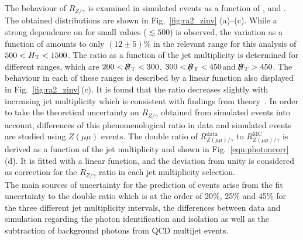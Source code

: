 The behaviour of $R_{Z/\gamma}$ is examined in simulated events as a function of \MHT, \HT and \NJets. The obtained distributions are shown in Fig.~\ref{fig:ra2_zinv} (a)--(c). While a strong dependence on \MHT for small values ($\lesssim 500$\gev) is observed, the variation as a function of \HT amounts to only $(12 \pm 5)\%$ in the relevant range for this analysis of $500 < H_{\text{T}} < 1500$\gev. The ratio as a function of the jet multiplicity is determined for different \MHT ranges, which are $200 < \slash\mkern-12mu{H}_{\text{T}} < 300$\gev, $300 < \slash\mkern-12mu{H}_{\text{T}} < 450$\gev and $\slash\mkern-12mu{H}_{\text{T}} > 450$\gev. The behaviour in each of these \MHT ranges is described by a linear function also displayed in Fig.~\ref{fig:ra2_zinv}\,(c). It is found that the ratio decreases slightly with increasing jet multiplicity which is consistent with findings from theory~\cite{Bern:2012vx, Bern:2011pa}. In order to take the theoretical uncertainty on $R_{Z/\gamma}$ obtained from simulated events into account, differences of this phenomenological ratio in data and simulated events are studied using $Z(\mu\mu)$ events. The double ratio of $R_{Z(\mu\mu)/\gamma}^{\text{data}}$ to $R_{Z(\mu\mu)/\gamma}^{\text{MC}}$ is derived as a function of the jet multiplicity and shown in Fig.~\ref{eqn:photoncorr}\,(d). It is fitted with a linear function, and the deviation from unity is considered as correction for the $R_{Z/\gamma}$ ratio in each jet multiplicity selection. \\
The main sources of uncertainty for the prediction of \ZInvJets events arise from the fit uncertainty to the double ratio which is at the order of 20\%, 25\% and 45\% for the three different jet multiplicity intervals, the differences between data and simulation regarding the photon identification and isolation as well as the subtraction of background photons from QCD multijet events.

